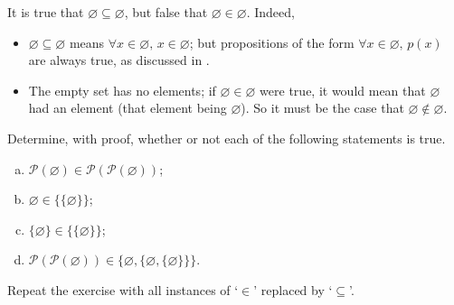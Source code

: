 \begin{example}
It is true that $\varnothing \subseteq \varnothing$, but false that $\varnothing \in \varnothing$. Indeed,
\begin{itemize}
\item $\varnothing \subseteq \varnothing$ means $\forall x \in \varnothing,\, x \in \varnothing$; but propositions of the form $\forall x \in \varnothing,\, p(x)$ are always true, as discussed in .
\item The empty set has no elements; if $\varnothing \in \varnothing$ were true, it would mean that $\varnothing$ had an element (that element being $\varnothing$). So it must be the case that $\varnothing \not \in \varnothing$.
\end{itemize}
\end{example}

\begin{exercise}
Determine, with proof, whether or not each of the following statements is true.
\begin{enumerate}[(a)]
\item $\mathcal{P}(\varnothing) \in \mathcal{P}(\mathcal{P}(\varnothing))$;
\item $\varnothing \in \{ \{ \varnothing \} \}$;
\item $\{ \varnothing \} \in \{ \{ \varnothing \} \}$;
\item $\mathcal{P}(\mathcal{P}(\varnothing)) \in \{ \varnothing, \{ \varnothing, \{ \varnothing \} \} \}$.
\end{enumerate}
Repeat the exercise with all instances of `$\in$' replaced by `$\subseteq$'.
\end{exercise}